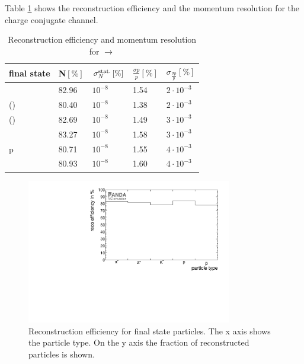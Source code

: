 	Table \ref{tab:finalstate_recoeff_cc} shows the reconstruction efficiency and the momentum resolution for the charge conjugate channel.
	
	\begin{table}
		\centering
		\caption{\propose Reconstruction efficiency and momentum resolution for \pbarpSystem $\rightarrow$ \excitedanticascade \cascade}
		\label{tab:finalstate_recoeff_cc}
		\begin{tabular}{lllll}
			\hline
			final state & N$\left[\%\right]$ & $\sigma_N^{\textnormal{stat.}}\left[\%\right]$ &$\frac{\sigma p}{p}\left[\%\right]$ & $\sigma_\frac{\sigma p}{p}\left[\%\right]$ \\
			\hline
			\hline
			\piplus &  82.96& $10^{-8}$&  1.54 & $2\cdot 10^{-3}$\\
			\piminusone(\cascade) & 80.40& $10^{-8}$&   1.38 & $2\cdot 10^{-3}$  \\
			\piminustwo(\lam) &  82.69&  $10^{-8}$& 1.49& $3\cdot 10^{-3}$\\
			\kplus& 83.27& $10^{-8}$&  1.58 & $3\cdot 10^{-3}$\\
			p &  80.71& $10^{-8}$&  1.55& $4\cdot 10^{-3}$\\
			\antiproton &  80.93& $10^{-8}$&  1.60 & $4\cdot 10^{-3}$\\\hline
			 
		\end{tabular}
	\end{table}
	
	\begin{figure}
	
		\centering
		\includegraphics[width=0.8\textwidth]{./plots/finalstate/reco_efficiency.pdf}
		\caption{\propose Reconstruction efficiency for final state particles. The x axis shows the particle type. 
				On the y axis the fraction of reconstructed particles is shown.}
		\label{fig:finalstate_recoeff}
	
	\end{figure}
	

